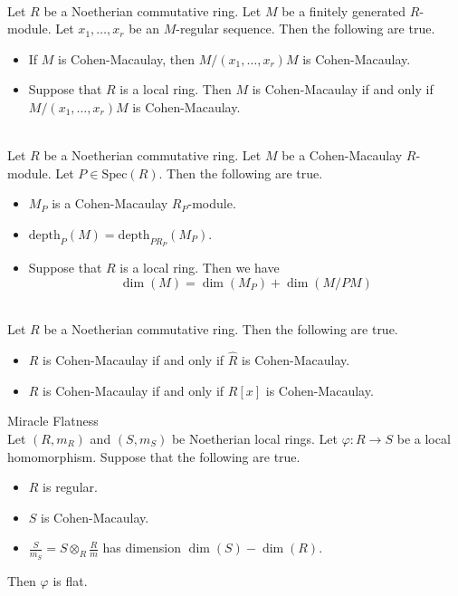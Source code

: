 \documentclass[a4paper]{article}
\begin{document}
\begin{prp}{}{}\\
Let $R$ be a Noetherian commutative ring. Let $M$ be a finitely generated $R$-module. Let $x_1,\dots,x_r$ be an $M$-regular sequence. Then the following are true. 
\begin{itemize}
\item If $M$ is Cohen-Macaulay, then $M/(x_1,\dots,x_r)M$ is Cohen-Macaulay. 
\item Suppose that $R$ is a local ring. Then $M$ is Cohen-Macaulay if and only if $M/(x_1,\dots,x_r)M$ is Cohen-Macaulay. 
\end{itemize}
\end{prp}

\begin{prp}{}{}\\
Let $R$ be a Noetherian commutative ring. Let $M$ be a Cohen-Macaulay $R$-module. Let $P\in\text{Spec}(R)$. Then the following are true. 
\begin{itemize}
\item $M_P$ is a Cohen-Macaulay $R_P$-module. 
\item $\text{depth}_P(M)=\text{depth}_{PR_P}(M_P)$. 
\item Suppose that $R$ is a local ring. Then we have $$\dim(M)=\dim(M_P)+\dim(M/PM)$$
\end{itemize}
\end{prp}

\begin{prp}{}{}\\
Let $R$ be a Noetherian commutative ring. Then the following are true. 
\begin{itemize}
\item $R$ is Cohen-Macaulay if and only if $\widehat{R}$ is Cohen-Macaulay. 
\item $R$ is Cohen-Macaulay if and only if $R[x]$ is Cohen-Macaulay. 
\end{itemize}
\end{prp}

\begin{thm}{Miracle Flatness}{}\\
Let $(R,m_R)$ and $(S,m_S)$ be Noetherian local rings. Let $\varphi:R\to S$ be a local homomorphism. Suppose that the following are true. 
\begin{itemize}
\item $R$ is regular. 
\item $S$ is Cohen-Macaulay. 
\item $\frac{S}{m_S}=S\otimes_R\frac{R}{m}$ has dimension $\dim(S)-\dim(R)$. 
\end{itemize}
Then $\varphi$ is flat. 
\end{thm}
\end{document}
